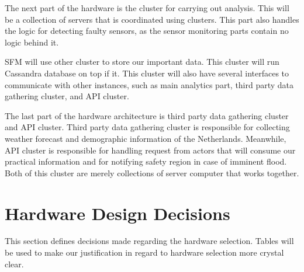 The next part of the hardware is the cluster for carrying out analysis. This will be a collection of servers that is coordinated using clusters. This part also handles the logic for detecting faulty sensors, as the sensor monitoring parts contain no logic behind it.

SFM will use other cluster to store our important data. This cluster will run Cassandra database on top if it. This cluster will also have several interfaces to communicate with other instances, such as main analytics part, third party data gathering cluster, and API cluster.

The last part of the hardware architecture is third party data gathering cluster and API cluster. Third party data gathering cluster is responsible for collecting weather forecast and demographic information of the Netherlands. Meanwhile, API cluster is responsible for handling request from actors that will consume our practical information and for notifying safety region in case of imminent flood. Both of this cluster are merely collections of server computer that works together.

\section{Hardware Design Decisions}
\label{sec:hardware-decisions}
This section defines decisions made regarding the hardware selection. Tables will be used to make our justification in regard to hardware selection more crystal clear.

